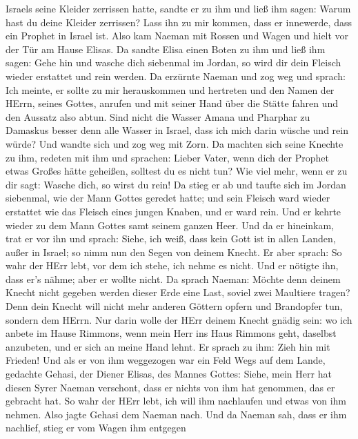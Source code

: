 Israels seine Kleider zerrissen hatte, sandte er zu ihm und ließ ihm
sagen: Warum hast du deine Kleider zerrissen? Lass ihn zu mir kommen,
dass er innewerde, dass ein Prophet in Israel ist.  Also kam
Naeman mit Rossen und Wagen und hielt vor der Tür am Hause Elisas.
 Da sandte Elisa einen Boten zu ihm und ließ ihm sagen:
Gehe hin und wasche dich siebenmal im Jordan, so wird dir dein Fleisch
wieder erstattet und rein werden.  Da erzürnte Naeman und
zog weg und sprach: Ich meinte, er sollte zu mir herauskommen und
hertreten und den Namen der HErrn, seines Gottes, anrufen und mit seiner
Hand über die Stätte fahren und den Aussatz also abtun. 
Sind nicht die Wasser Amana und Pharphar zu Damaskus besser denn alle
Wasser in Israel, dass ich mich darin wüsche und rein würde? Und wandte
sich und zog weg mit Zorn.  Da machten sich seine Knechte
zu ihm, redeten mit ihm und sprachen: Lieber Vater, wenn dich der
Prophet etwas Großes hätte geheißen, solltest du es nicht tun? Wie viel
mehr, wenn er zu dir sagt: Wasche dich, so wirst du rein! 
Da stieg er ab und taufte sich im Jordan siebenmal, wie der Mann Gottes
geredet hatte; und sein Fleisch ward wieder erstattet wie das Fleisch
eines jungen Knaben, und er ward rein.  Und er kehrte
wieder zu dem Mann Gottes samt seinem ganzen Heer. Und da er hineinkam,
trat er vor ihn und sprach: Siehe, ich weiß, dass kein Gott ist in allen
Landen, außer in Israel; so nimm nun den Segen von deinem Knecht.
 Er aber sprach: So wahr der HErr lebt, vor dem ich stehe,
ich nehme es nicht. Und er nötigte ihn, dass er's nähme; aber er wollte
nicht.  Da sprach Naeman: Möchte denn deinem Knecht nicht
gegeben werden dieser Erde eine Last, soviel zwei Maultiere tragen? Denn
dein Knecht will nicht mehr anderen Göttern opfern und Brandopfer tun,
sondern dem HErrn.  Nur darin wolle der HErr deinem Knecht
gnädig sein: wo ich anbete im Hause Rimmons, wenn mein Herr ins Haus
Rimmons geht, daselbst anzubeten, und er sich an meine Hand lehnt.
 Er sprach zu ihm: Zieh hin mit Frieden! Und als er von ihm
weggezogen war ein Feld Wegs auf dem Lande,  gedachte
Gehasi, der Diener Elisas, des Mannes Gottes: Siehe, mein Herr hat
diesen Syrer Naeman verschont, dass er nichts von ihm hat genommen, das
er gebracht hat. So wahr der HErr lebt, ich will ihm nachlaufen und
etwas von ihm nehmen.  Also jagte Gehasi dem Naeman nach.
Und da Naeman sah, dass er ihm nachlief, stieg er vom Wagen ihm entgegen

